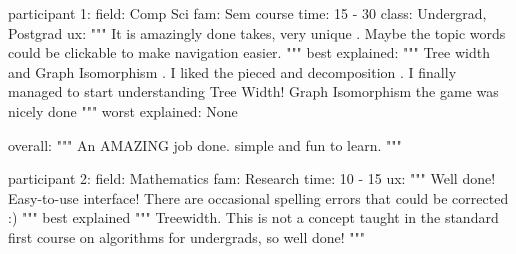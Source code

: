 
participant 1:
   field: Comp Sci
   fam: Sem course
   time: 15 - 30
   class: Undergrad, Postgrad
   ux:
      """
      It is amazingly done takes, very unique . Maybe the topic words could be
      clickable to make navigation easier.
      """
   best explained:
      """
      Tree width and Graph Isomorphism . I liked the pieced and decomposition .
      I finally managed to start understanding Tree Width!  Graph Isomorphism
      the game was nicely done
      """
   worst explained: None

   overall:
      """
      An AMAZING job done. simple and fun to learn.
      """


participant 2:
   field: Mathematics
   fam: Research
   time: 10 - 15
   ux:
      """
      Well done! Easy-to-use interface! There are occasional spelling errors
      that could be corrected :)
      """
   best explained
      """
      Treewidth. This is not a concept taught in the standard first course on
      algorithms for undergrads, so well done!
      """
